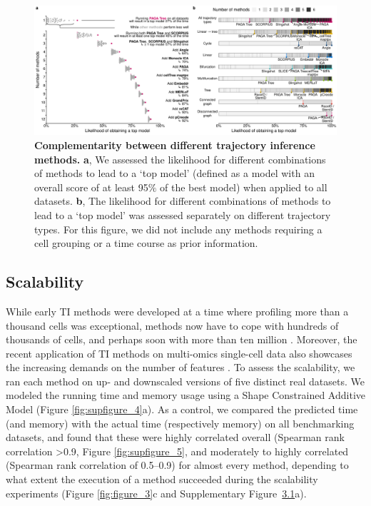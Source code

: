 \begin{figure}[tbh!]
	\centering\includegraphics[width=\linewidth]{fig/figure_4.pdf}
	\caption{
		\textbf{Complementarity between different trajectory inference methods.}
		\textbf{a}, We assessed the likelihood for different combinations of methods to lead to a ‘top model’ (defined as a model with an overall score of at least 95$\%$ of the best model) when applied to all datasets. \textbf{b}, The likelihood for different combinations of methods to lead to a ‘top model’ was assessed separately on different trajectory types. For this figure, we did not include any methods requiring a cell grouping or a time course as prior information.
	}
	\label{fig:figure_4}
\end{figure}

\subsection{Scalability}

While early TI methods were developed at a time where profiling more than a thousand cells was exceptional, methods now have to cope with hundreds of thousands of cells, and perhaps soon with more than ten million \cite{svensson_exponentialscalingsinglecell_2018}. Moreover, the recent application of TI methods on multi-omics single-cell data also showcases the increasing demands on the number of features \cite{cao_jointprofilingchromatin_2018}. To assess the scalability, we ran each method on up- and downscaled versions of five distinct real datasets. We modeled the running time and memory usage using a Shape Constrained Additive Model \cite{pya_shapeconstrainedadditive_2015} (Figure \ref{fig:supfigure_4}a). As a control, we compared the predicted time (and memory) with the actual time (respectively memory) on all benchmarking datasets, and found that these were highly correlated overall (Spearman rank correlation >0.9, Figure \ref{fig:supfigure_5}, and moderately to highly correlated (Spearman rank correlation of 0.5–0.9) for almost every method, depending to what extent the execution of a method succeeded during the scalability experiments (Figure \ref{fig:figure_3}c and Supplementary Figure~\hyperref[fig:suppfig_2]{3.1}a).

